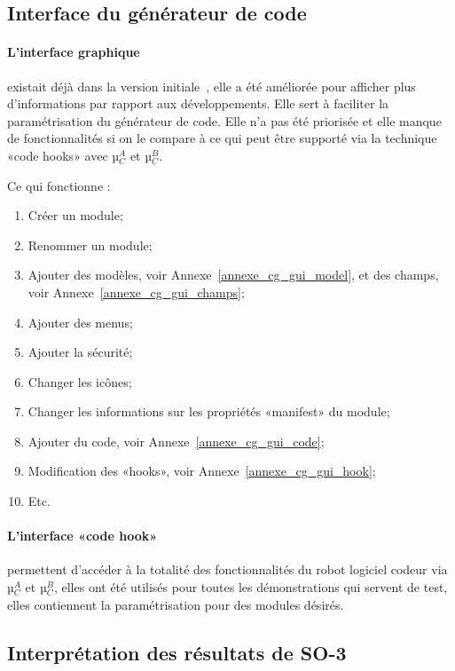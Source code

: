 \subsection{Interface du générateur de code}

\paragraph{L'interface graphique}

 existait déjà dans la version initiale~\cite{bluiksnot_repo}, elle a été améliorée pour afficher plus d'informations par rapport aux développements. Elle sert à faciliter la paramétrisation du générateur de code. Elle n’a pas été priorisée et elle manque de fonctionnalités si on le compare à ce qui peut être supporté via la technique «code hooks» avec µ$_C^A$ et µ$_C^B$.

Ce qui fonctionne : 
\begin{enumerate}
    \item Créer un module;
    \item Renommer un module;
    \item Ajouter des modèles, voir Annexe~\ref{annexe_cg_gui_model}, et des champs, voir Annexe~\ref{annexe_cg_gui_champs};
    \item Ajouter des menus;
    \item Ajouter la sécurité;
    \item Changer les icônes;
    \item Changer les informations sur les propriétés «manifest» du module;
    \item Ajouter du code, voir Annexe~\ref{annexe_cg_gui_code};
    \item Modification des «hooks», voir Annexe~\ref{annexe_cg_gui_hook};
    \item Etc.
\end{enumerate}

\paragraph{L'interface «code hook»}


permettent d’accéder à la totalité des fonctionnalités du robot logiciel codeur via µ$_C^A$ et µ$_C^B$, elles ont été utilisés pour toutes les démonstrations qui servent de test, elles contiennent la paramétrisation pour des modules désirés.

\subsection{Interprétation des résultats de SO-3}


